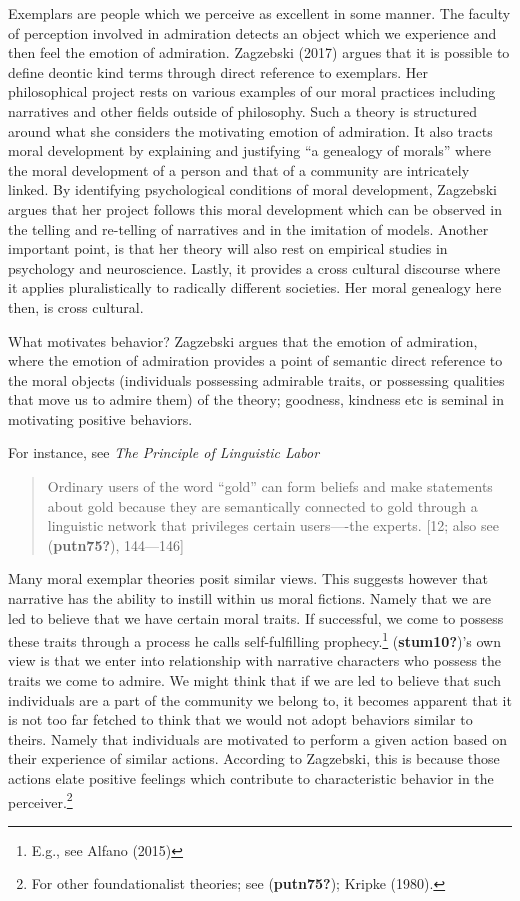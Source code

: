 \documentclass[12pt]{book}
\theoremstyle{definition}
\theoremstyle{remark}
\begin{document}
Exemplars are people which we perceive as excellent in some manner. The faculty of perception involved in admiration detects an object which we experience and then feel the emotion of admiration. Zagzebski (2017) argues that it is possible to define deontic kind terms through direct reference to exemplars. Her philosophical project rests on various examples of our moral practices including narratives and other fields outside of philosophy. Such a theory is structured around what she considers the motivating emotion of admiration. It also tracts moral development by explaining and justifying ``a genealogy of morals'' where the moral development of a person and that of a community are intricately linked. By identifying psychological conditions of moral development, Zagzebski argues that her project follows this moral development which can be observed in the telling and re-telling of narratives and in the imitation of models. Another important point, is that her theory will also rest on empirical studies in psychology and neuroscience. Lastly, it provides a cross cultural discourse where it applies pluralistically to radically different societies. Her moral genealogy here then, is cross cultural.

What motivates behavior? Zagzebski argues that the emotion of admiration, where the emotion of admiration provides a point of semantic direct reference to the moral objects (individuals possessing admirable traits, or possessing qualities that move us to admire them) of the theory; goodness, kindness etc is seminal in motivating positive behaviors.

For instance, see \emph{The Principle of Linguistic Labor}

\begin{quote}
Ordinary users of the word ``gold'' can form beliefs and make statements about gold because they are semantically connected to gold through a linguistic network that privileges certain users----the experts. {[}12; also see (\textbf{putn75?}), 144---146{]}
\end{quote}

Many moral exemplar theories posit similar views. This suggests however that narrative has the ability to instill within us moral fictions. Namely that we are led to believe that we have certain moral traits. If successful, we come to possess these traits through a process he calls self-fulfilling prophecy.\footnote{E.g., see Alfano (2015)} (\textbf{stum10?})'s own view is that we enter into relationship with narrative characters who possess the traits we come to admire. We might think that if we are led to believe that such individuals are a part of the community we belong to, it becomes apparent that it is not too far fetched to think that we would not adopt behaviors similar to theirs. Namely that individuals are motivated to perform a given action based on their experience of similar actions. According to Zagzebski, this is because those actions elate positive feelings which contribute to characteristic behavior in the perceiver.\footnote{For other foundationalist theories; see (\textbf{putn75?}); Kripke (1980).}
\end{document}
